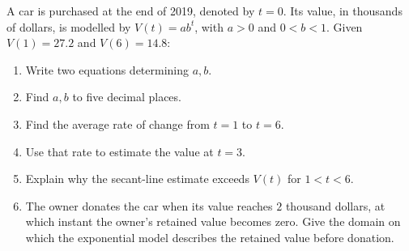 A car is purchased at the end of 2019, denoted by $t=0$. Its value, in thousands of dollars, is modelled by $V(t)=ab^t$, with $a>0$ and $0<b<1$. Given $V(1)=27.2$ and $V(6)=14.8$:
\begin{enumerate}
\item Write two equations determining $a,b$.
\item Find $a,b$ to five decimal places.
\item Find the average rate of change from $t=1$ to $t=6$.
\item Use that rate to estimate the value at $t=3$.
\item Explain why the secant-line estimate exceeds $V(t)$ for $1<t<6$.
\item The owner donates the car when its value reaches $2$ thousand dollars, at which instant the owner's retained value becomes zero. Give the domain on which the exponential model describes the retained value before donation.
\end{enumerate}
